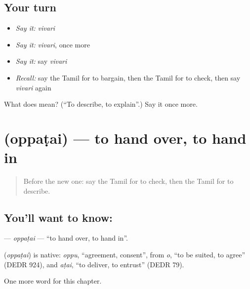 \subsection*{Your turn}
\begin{itemize}
\raggedright
  \item \emph{Say it:} \emph{vivari}
  \item \emph{Say it:} \emph{vivari}, once more
  \item \emph{Say it:} say \emph{vivari}
  \item \emph{Recall:} say the Tamil for to bargain, then the Tamil for to check, then say \emph{vivari} again
\end{itemize}

\begin{tcolorbox}[breakable,colback=teal!4,colframe=teal!35!black,title={Before you move on}]
What does  mean? (\textquotedblleft{}To describe, to explain\textquotedblright{}.) Say it once more.
\end{tcolorbox}
\section[\texorpdfstring{\ta{ஒப்படை} (oppaṭai)}{ஒப்படை (oppaṭai)}]{ (oppaṭai) — to hand over, to hand in}

\label{lesson:TA-C164-oppatai}



\begin{quote}
Before the new one: say the Tamil for to check, then the Tamil for to describe.
\end{quote}

\subsection*{You'll want to know: }
\textbf{} — \emph{oppaṭai} — \textquotedblleft{}to hand over, to hand in\textquotedblright{}.

\begin{cousinweb}
\textbf{} (\emph{oppaṭai}) is native: \emph{oppu}, \textquotedblleft{}agreement, consent\textquotedblright{}, from \emph{o}, \textquotedblleft{}to be suited, to agree\textquotedblright{} (DEDR 924), and \emph{aṭai}, \textquotedblleft{}to deliver, to entrust\textquotedblright{} (DEDR 79).
\end{cousinweb}

\begin{grammarlens}[title={What you've built}]
One more word for this chapter.
\end{grammarlens}

